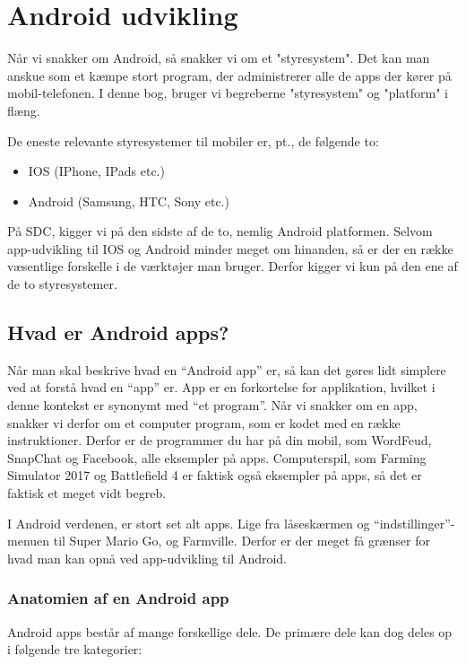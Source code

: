 \chapter{Android udvikling}

Når vi snakker om Android, så snakker vi om et "styresystem". Det kan man 
anskue som et kæmpe stort program, der administrerer alle de apps der kører på 
mobil-telefonen. I denne bog, bruger vi begreberne "styresystem" og "platform" 
i flæng.

De eneste relevante styresystemer til mobiler er, pt., de følgende to:

\begin{itemize}
	\item IOS (IPhone, IPads etc.)
	\item Android (Samsung, HTC, Sony etc.)
\end{itemize}

På SDC, kigger vi på den sidste af de to, nemlig Android platformen. Selvom 
app-udvikling til IOS og Android minder meget om hinanden, så er der en række 
væsentlige forskelle i de værktøjer man bruger. Derfor kigger vi kun på den ene 
af de to styresystemer.

\section{Hvad er Android apps?}


Når man skal beskrive hvad en ``Android app'' er, så kan det gøres lidt 
simplere ved at forstå hvad en ``app'' er. App er en forkortelse for 
applikation, hvilket i denne kontekst er synonymt med ``et program''. Når vi 
snakker om en app, snakker vi derfor om et computer program, som er kodet med 
en række instruktioner. Derfor er de programmer du har på din mobil, som 
WordFeud, SnapChat og Facebook, alle eksempler på apps. Computerspil, som 
Farming Simulator 2017 og Battlefield 4 er faktisk også eksempler på apps, så 
det er faktisk et meget vidt begreb. 

I Android verdenen, er stort set alt apps. Lige fra låseskærmen og 
``indstillinger''-menuen til Super Mario Go, og Farmville. Derfor er der meget 
få grænser for hvad man kan opnå ved app-udvikling til Android.

\subsection{Anatomien af en Android app}
Android apps består af mange forskellige dele. De primære dele kan dog deles op i følgende tre kategorier:


